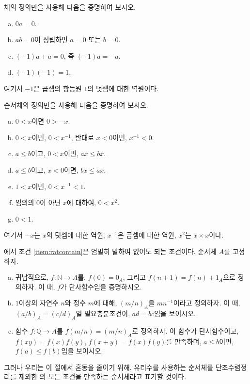 \begin{exercise}
    체의 정의만을 사용해 다음을 증명하여 보시오.
    \begin{enumerate}[(a)]
        \item $0a = 0$.
        \item $ab = 0$이 성립하면 $a = 0$ 또는 $b = 0$.
        \item $(-1)a + a = 0$, 즉 $(-1)a = -a$.
        \item $(-1)(-1) = 1$.
    \end{enumerate}
    여기서 $-1$은 곱셈의 항등원 $1$의 덧셈에 대한 역원이다.
\end{exercise}
\begin{exercise}
    순서체의 정의만을 사용해 다음을 증명하여 보시오.
    \begin{enumerate}[(a)]
        \item $0 < x$이면 $0 > -x$.
        \item $0 < x$이면, $0 < x^{-1}$, 반대로 $x < 0$이면, $x^{-1} < 0$.
        \item $a \leq b$이고, $0 < x$이면, $ax \leq bx$.
        \item $a \leq b$이고, $x < 0$이면, $bx \leq ax$.
        \item $1 < x$이면, $0 < x^{-1} < 1$.
        \item 임의의 $0$이 아닌 $x$에 대하여, $0 < x^2$.
        \item $0 < 1$.
    \end{enumerate}
    여기서 $-x$는 $x$의 덧셈에 대한 역원, $x^{-1}$은 곱셈에 대한 역원, $x^2$는 $x \times x$이다.
\end{exercise}
\begin{exercise}
    에서 조건 \ref{item:ratcontain}은 엄밀히 말하여 없어도 되는 조건이다.
    순서체 $A$를 고정하자.
    \begin{enumerate}[(a)]
        \item 귀납적으로, $f: \mathbb{N} \to A$를, $f(0) = 0_A$, 그리고 $f(n + 1) = f(n) + 1_A$으로 정의하자.
        이 때, $f$가 단사함수임을 증명하시오.
        \item $1$이상의 자연수 $n$와 정수 $m$에 대해, $(m/n)_A$을 $mn^{-1}$이라고 정의하자.
        이 때, $(a/b)_A = (c/d)_A$일 필요충분조건이, $ad = bc$임을 보이시오.
        \item 함수 $f: \mathbb{Q} \to A$를 $f(m/n) = (m/n)_A$로 정의하자.
        이 함수가 단사함수이고, $f(xy) = f(x)f(y)$, $f(x + y) = f(x)f(y)$를 만족하며, $a \leq b$이면, $f(a) \leq f(b)$임을 보이시오.
    \end{enumerate}
    그러나 우리는 이 절에서 혼동을 줄이기 위해, 유리수를 사용하는 순서체를 단조수렴정리를 제외한 의 모든 조건을 만족하는 순서체라고 표기할 것이다.
\end{exercise}
